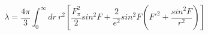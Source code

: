\begin{equation}
\lambda= \frac{4 \pi}{3} \int_0^\infty dr~r^2 [ \frac{F_\pi^2}{2} sin^2F +\frac{2}{e^2} sin^2F (F'^2+\frac{sin^2F}{r^2})] \label{eq:2s}
\end{equation}

